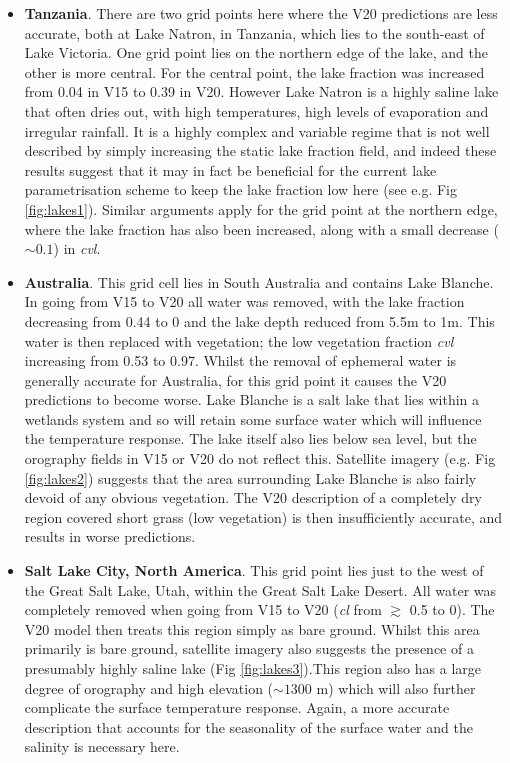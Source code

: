 \documentclass[twocolumn]{article}
\begin{document}
\begin{itemize}
	\item \textbf{Tanzania}. There are two grid points here where the V20 predictions are less accurate, both at Lake Natron, in Tanzania, which lies to the south-east of Lake Victoria. One grid point lies on the northern edge of the lake, and the other is more central. For the central point, the lake fraction was increased from 0.04 in V15 to 0.39 in V20. However Lake Natron is a highly saline lake that often dries out, with high temperatures, high levels of evaporation and irregular rainfall. It is a highly complex and variable regime that is not well described by simply increasing the static lake fraction field, and indeed these results suggest that it may in fact be beneficial for the current lake parametrisation scheme to keep the lake fraction low here (see e.g. Fig \ref{fig:lakes1}). Similar arguments apply for the grid point at the northern edge, where the lake fraction has also been increased, along with a small decrease ($\sim 0.1$) in \textit{cvl}. 
	
	\item \textbf{Australia}. This grid cell lies in South Australia and contains Lake Blanche. In going from V15 to V20 all water was removed, with the lake fraction decreasing from 0.44 to 0 and the lake depth reduced from 5.5m to 1m. This water is then replaced with vegetation; the low vegetation fraction \textit{cvl} increasing from 0.53 to 0.97. Whilst the removal of ephemeral water is generally accurate for Australia, for this grid point it causes the V20 predictions to become worse. Lake Blanche is a salt lake that lies within a wetlands system and so will retain some surface water which will influence the temperature response. The lake itself also lies below sea level, but the orography fields in V15 or V20 do not reflect this. Satellite imagery (e.g. Fig \ref{fig:lakes2}) suggests that the area surrounding Lake Blanche is also fairly devoid of any obvious vegetation. The V20 description of a completely dry region covered short grass (low vegetation) is then insufficiently accurate, and results in worse predictions. 
	
	\item \textbf{Salt Lake City, North America}. This grid point lies just to the west of the Great Salt Lake, Utah, within the Great Salt Lake Desert. All water was completely removed when going from V15 to V20 (\textit{cl} from $\gtrsim$ 0.5 to 0). The V20 model then treats this region simply as bare ground. Whilst this area primarily is bare ground, satellite imagery also suggests the presence of a presumably highly saline lake (Fig \ref{fig:lakes3}).This region also has a large degree of orography and high elevation ($\sim 1300$ m) which will also further complicate the surface temperature response. Again, a more accurate description that accounts for the seasonality of the surface water and the salinity is necessary here.
	

\end{itemize}
\end{document}
